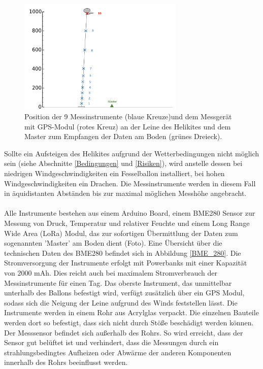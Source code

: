 \documentclass[a4paper,11pt,DIV=calc,tablecaptionabove,headinclude,twoside]{article}
\begin{document}
\begin{figure}[t]
\centering
\includegraphics[width=0.7\textwidth]{Helikite.png}
\captionsetup{width=11cm}
\caption{Position der 9 Messinstrumente (blaue Kreuze)und dem Messgerät mit GPS-Modul (rotes Kreuz) an der Leine des Helikites und dem Master zum Empfangen der Daten am Boden (grünes Dreieck). }
\label{helikite}
\end{figure}
Sollte ein Aufsteigen des Helikites aufgrund der Wetterbedingungen nicht möglich sein (siehe Abschnitte \ref{Bedingungen} und \ref{Risiken}), wird anstelle dessen bei niedrigen Windgeschwindigkeiten ein Fesselballon installiert, bei hohen Windgeschwindigkeiten ein Drachen. Die Messinstrumente werden in diesem Fall in äquidistanten Abständen bis zur maximal möglichen Messhöhe angebracht. \\\\
Alle Instrumente bestehen aus einem Arduino Board, einem BME280 Sensor zur Messung von Druck, Temperatur und relativer Feuchte und einem Long Range Wide Area (LoRa) Modul, das zur sofortigen Übermittlung der Daten zum sogenannten 'Master' am Boden dient (Foto). Eine Übersicht über die technischen Daten des BME280 befindet sich in Abbildung \ref{BME_280}. Die Stromversorgung der Instrumente erfolgt mit Powerbanks mit einer Kapazität von 2000 mAh. Dies reicht auch bei maximalem Stromverbrauch der Messinstrumente für einen Tag. Das oberste Instrument, das unmittelbar unterhalb des Ballons befestigt wird, verfügt zusätzlich über ein GPS Modul, sodass sich die Neigung der Leine aufgrund des Winds feststellen lässt. Die Instrumente werden in einem Rohr aus Acrylglas verpackt. Die einzelnen Bauteile werden dort so befestigt, dass sich nicht durch Stöße beschädigt werden können. Der Messsensor befindet sich außerhalb des Rohrs. So wird erreicht, dass der Sensor gut belüftet ist und verhindert, dass die Messungen durch ein strahlungsbedingtes Aufheizen oder Abwärme der anderen Komponenten innerhalb des Rohrs beeinflusst werden.  
\end{document}
